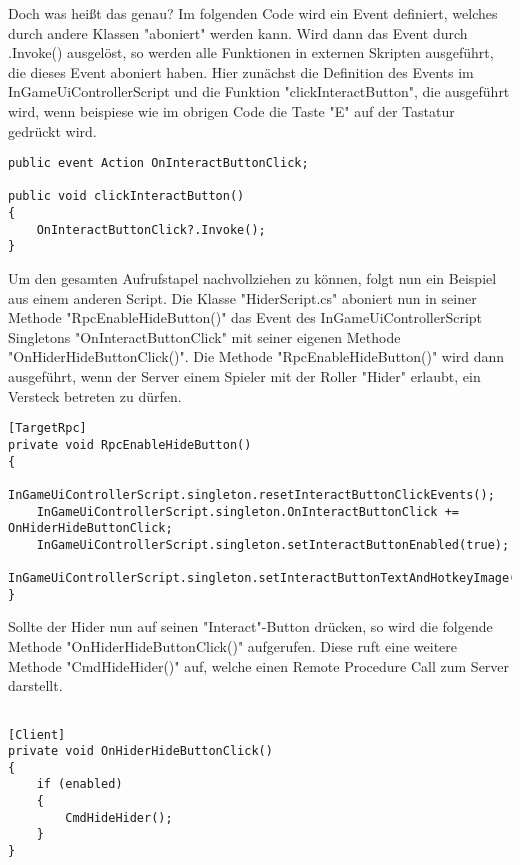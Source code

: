 Doch was heißt das genau? Im folgenden Code wird ein Event definiert, welches durch andere Klassen "aboniert" werden kann. Wird dann das Event durch .Invoke() ausgelöst, so werden alle Funktionen in externen Skripten ausgeführt, die dieses Event aboniert haben. Hier zunächst die Definition des Events im InGameUiControllerScript und die Funktion "clickInteractButton", die ausgeführt wird, wenn beispiese wie im obrigen Code die Taste "E" auf der Tastatur gedrückt wird.

\begin{lstlisting}[caption= InGameUiControllerScript.cs OnInteractButtonClick Event]
public event Action OnInteractButtonClick;	

public void clickInteractButton()
{
	OnInteractButtonClick?.Invoke();
}
\end{lstlisting}

Um den gesamten Aufrufstapel\cite{Wikipedia.2021k} nachvollziehen zu können, folgt nun ein Beispiel aus einem anderen Script.
Die Klasse "HiderScript.cs" aboniert nun in seiner Methode "RpcEnableHideButton()" das Event des InGameUiControllerScript Singletons "OnInteractButtonClick" mit seiner eigenen Methode "OnHiderHideButtonClick()". Die Methode "RpcEnableHideButton()" wird dann ausgeführt, wenn der Server einem Spieler mit der Roller "Hider" erlaubt, ein Versteck betreten zu dürfen.

\begin{lstlisting}[caption= HiderScript.cs Subscribe to InGameUiControllerScript Event]
[TargetRpc]
private void RpcEnableHideButton()
{
	InGameUiControllerScript.singleton.resetInteractButtonClickEvents();
	InGameUiControllerScript.singleton.OnInteractButtonClick += OnHiderHideButtonClick;
	InGameUiControllerScript.singleton.setInteractButtonEnabled(true);
	InGameUiControllerScript.singleton.setInteractButtonTextAndHotkeyImage("Hide");
}
\end{lstlisting}

Sollte der Hider nun auf seinen "Interact"-Button drücken, so wird die folgende Methode "OnHiderHideButtonClick()" aufgerufen. Diese ruft eine weitere Methode "CmdHideHider()" auf, welche einen Remote Procedure Call\cite{.05.02.2022} zum Server darstellt.

\begin{lstlisting}[caption= HiderScript.csOnHiderHideButtonClick() Method]

[Client]
private void OnHiderHideButtonClick()
{
	if (enabled)
	{
		CmdHideHider();
	}
}

\end{lstlisting}

